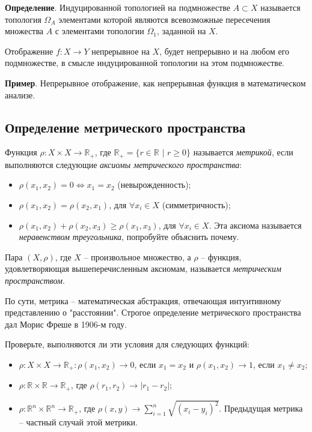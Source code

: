 \documentclass[a4paper]{book}
\begin{document}
\textbf{Определение}. Индуцированной топологией на подмножестве $A\subset X$ называется топология $\Omega_A$ элементами которой являются всевозможные пересечения множества $A$ с элементами топологии $\Omega_1$, заданной на $X$. 

Отображение $f: X\rightarrow Y$ непрерывное на $X$, будет непрерывно и на любом его подмножестве, в смысле индуцированной топологии на этом подмножестве. 


\textbf{Пример}. Непрерывное отображение, как непрерывная функция в математическом анализе. 


\subsection{Определение метрического пространства}

Функция $\rho:X\times X \rightarrow \mathbb{R}_+$, где $\mathbb{R}_+ = \{r\in\mathbb{R}$ $|$ $r \geqslant 0\}$ называется \textit{метрикой}, если выполняются следующие \textit{аксиомы метрического пространства}:
\begin{itemize}
	\item $\rho(x_1,x_2) = 0 \Leftrightarrow x_1=x_2$ (невырожденность);
	\item $\rho(x_1,x_2) = \rho(x_2,x_1)$, для $\forall x_i\in X$ (симметричность);
	\item $\rho(x_1,x_2) + \rho(x_2,x_3) \geqslant \rho(x_1,x_3)$, для $\forall x_i\in X$. Эта аксиома называется \textit{неравенством треугольника}, попробуйте объяснить почему. 
\end{itemize} 

Пара $(X,\rho)$, где $X$ -- произвольное множество, а $\rho$ -- функция, удовлетворяющая вышеперечисленным аксиомам, называется \textit{метрическим пространством}. 

По сути, метрика -- математическая абстракция, отвечающая интуитивному представлению о "расстоянии". Строгое определение метрического пространства дал Морис Фреше в 1906-м году. 

Проверьте, выполняются ли эти условия для следующих функций: 
\begin{itemize}
	\item $\rho: X\times X \rightarrow\mathbb{R}_+: \rho(x_1,x_2) \rightarrow 0$, если $x_1=x_2$ и $\rho(x_1,x_2) \rightarrow 1$, если $x_1\neq x_2$;
	\item $\rho:\mathbb{R} \times \mathbb{R} \rightarrow \mathbb{R}_+$, где $\rho(r_1,r_2) \rightarrow |r_1 - r_2|$;
	\item $\rho:\mathbb{R}^n \times\mathbb{R}^n\rightarrow \mathbb{R}_+$, где $\rho(x,y) \rightarrow \sum_{i=1}^{n}\sqrt{(x_i - y_i)^2}$. Предыдущая метрика -- частный случай этой метрики. 
\end{itemize}
\end{document}
